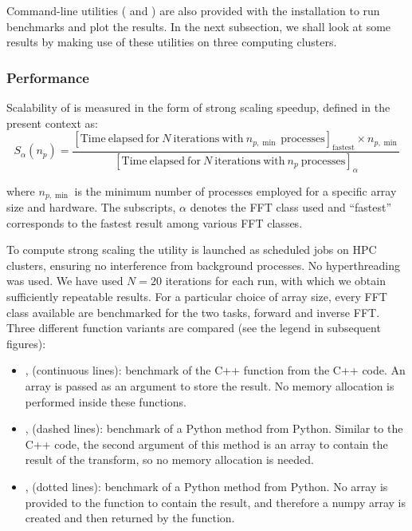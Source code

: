 Command-line utilities ( and
) are also provided with the 
installation to run benchmarks and plot the results. In the next subsection, we
shall look at some results by making use of these utilities on three computing
clusters.

\subsubsection{Performance}



Scalability of  is measured in the form of strong scaling speedup,
defined in the present context as:
\begin{equation*}
S_\alpha(n_p) = \frac
{[\mathrm{Time\ elapsed\ for\ } N \mathrm{\ iterations\ with\ }n_{p,\min}\mathrm{\ processes}]_{\mathrm{fastest}}
\times n_{p,\min}}
{[\mathrm{Time\ elapsed\ for\ } N \mathrm{\ iterations\ with\ } n_p \mathrm{\
processes}]_\alpha}
\label{eq:speedup}
\end{equation*}

where $n_{p,\min}$ is the minimum number of processes employed for a specific
array size and hardware. The subscripts, $\alpha$ denotes the FFT class used and
``fastest'' corresponds to the fastest result among various FFT classes.

To compute strong scaling the utility  is launched
as scheduled jobs on HPC clusters, ensuring no interference from background
processes. No hyperthreading was used.
%
We have used $N=20$ iterations for each run, with which we obtain sufficiently
repeatable results.
%
For a particular choice of array size, every FFT class available are
benchmarked for the two tasks, forward and inverse FFT. Three different function
variants are compared (see the legend in subsequent figures):

\begin{itemize}

\item {},  (continuous lines): benchmark
of the C++ function from the C++ code. An array is passed as an argument to store
the result. No memory allocation is performed inside these functions.

\item {},  (dashed lines):
benchmark of a Python method from Python. Similar to the C++ code, the second
argument of this method is an array to contain the result of the transform, so no
memory allocation is needed.

\item {},  (dotted lines):
benchmark of a Python method from Python. No array is provided to the function to
contain the result, and therefore a numpy array is created and then returned by
the function.

\end{itemize}

